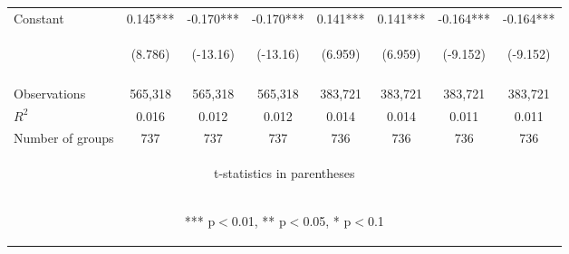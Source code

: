 \documentclass[]{article}
\begin{document}
\begin{center}
\begin{tabular}{lccccccc}
Constant & 0.145*** & -0.170*** & -0.170*** & 0.141*** & 0.141*** & -0.164*** & -0.164*** \\
 & \begin{footnotesize}(8.786)\end{footnotesize} & \begin{footnotesize}(-13.16)\end{footnotesize} & \begin{footnotesize}(-13.16)\end{footnotesize} & \begin{footnotesize}(6.959)\end{footnotesize} & \begin{footnotesize}(6.959)\end{footnotesize} & \begin{footnotesize}(-9.152)\end{footnotesize} & \begin{footnotesize}(-9.152)\end{footnotesize} \\
\vspace{4pt} & \begin{footnotesize}\end{footnotesize} & \begin{footnotesize}\end{footnotesize} & \begin{footnotesize}\end{footnotesize} & \begin{footnotesize}\end{footnotesize} & \begin{footnotesize}\end{footnotesize} & \begin{footnotesize}\end{footnotesize} & \begin{footnotesize}\end{footnotesize} \\
Observations & 565,318 & 565,318 & 565,318 & 383,721 & 383,721 & 383,721 & 383,721 \\
$R^2$ & 0.016 & 0.012 & 0.012 & 0.014 & 0.014 & 0.011 & 0.011 \\
 Number of groups & 737 & 737 & 737 & 736 & 736 & 736 & 736 \\ \hline
\multicolumn{8}{c}{\begin{footnotesize} t-statistics in parentheses\end{footnotesize}} \\
\multicolumn{8}{c}{\begin{footnotesize} *** p$<$0.01, ** p$<$0.05, * p$<$0.1\end{footnotesize}} \\
\end{tabular}
\end{center}
\end{document}
